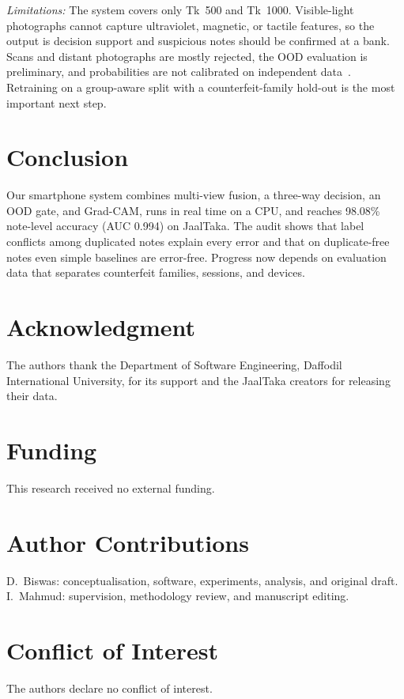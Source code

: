 \documentclass[journal]{IEEEtran}
\begin{document}
\textit{Limitations:} The system covers only Tk~500 and Tk~1000. Visible-light
photographs cannot capture ultraviolet, magnetic, or tactile features, so the output is
decision support and suspicious notes should be confirmed at a bank. Scans and distant
photographs are mostly rejected, the OOD evaluation is preliminary, and probabilities
are not calibrated on independent data~\cite{guo2017calibration}. Retraining on a
group-aware split with a counterfeit-family hold-out is the most important next step.

\section{Conclusion}
\label{sec:conclusion}

Our smartphone system combines multi-view fusion, a three-way decision, an OOD gate, and
Grad-CAM, runs in real time on a CPU, and reaches 98.08\% note-level accuracy (AUC 0.994)
on JaalTaka. The audit shows that label conflicts among duplicated notes explain every
error and that on duplicate-free notes even simple baselines are error-free. Progress now
depends on evaluation data that separates counterfeit families, sessions, and devices.

\section*{Acknowledgment}
The authors thank the Department of Software Engineering, Daffodil International
University, for its support and the JaalTaka creators for releasing their data.

\section*{Funding}
This research received no external funding.

\section*{Author Contributions}
D.~Biswas: conceptualisation, software, experiments, analysis, and original draft.
I.~Mahmud: supervision, methodology review, and manuscript editing.

\section*{Conflict of Interest}
The authors declare no conflict of interest.
\end{document}
